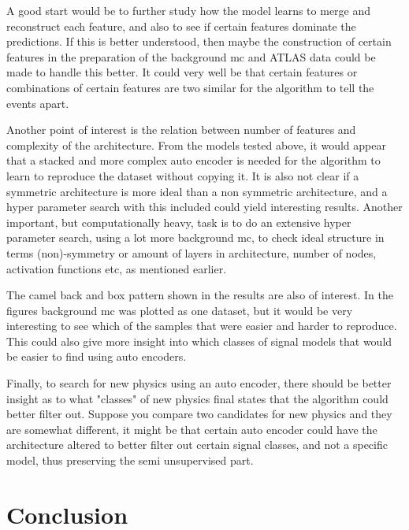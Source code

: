 \documentclass[ reprint, amsmath,amssymb, aps, nofootinbib]{revtex4-2}
\begin{document}
A good start would be to further study how the model learns to merge and reconstruct each feature, and also to see if certain features dominate the predictions. If this is better understood, then maybe the construction of certain features in the preparation of the background mc and ATLAS data could be made to handle this better. It could very well be that certain features or combinations of certain features are two similar for the algorithm to tell the events apart. \par 

Another point of interest is the relation between number of features and complexity of the architecture. From the models tested above, it would appear that a stacked and more complex auto encoder is needed for the algorithm to learn to reproduce the dataset without copying it. It is also not clear if a symmetric architecture is more ideal than a non symmetric architecture, and a hyper parameter search with this included could yield interesting results. Another important, but computationally heavy, task is to do an extensive hyper parameter search, using a lot more background mc, to check ideal structure in terms (non)-symmetry or amount of layers in architecture, number of nodes, activation functions etc, as mentioned earlier. \par 

The camel back and box pattern shown in the results are also of interest. In the figures background mc was plotted as one dataset, but it would be very interesting to see which of the samples that were easier and harder to reproduce. This could also give more insight into which classes of signal models that would be easier to find using auto encoders. \par Finally, to search for new physics using an auto encoder, there should be better insight as to what "classes" of new physics final states that the algorithm could better filter out. Suppose you compare two candidates for new physics and they are somewhat different, it might be that certain auto encoder could have the architecture altered to better filter out certain signal classes, and not a specific model, thus preserving the semi unsupervised part.   \par \par


\section{Conclusion}
\end{document}
